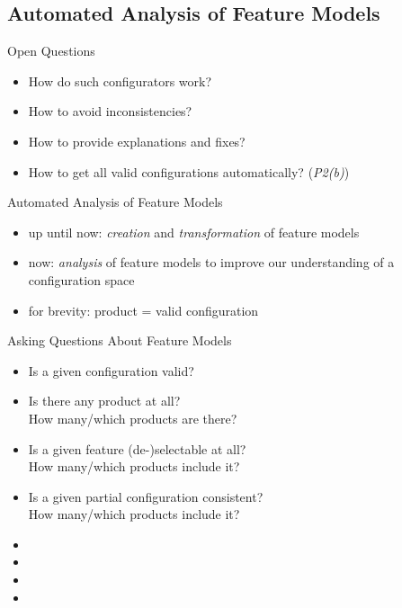 \subsection{Automated Analysis of Feature Models}

\begin{frame}{\myframetitle}
	\begin{mycolumns}
		\begin{note}{Open Questions}
			\begin{itemize}
				\item How do such configurators work?
				\item How to avoid inconsistencies?
				\item How to provide explanations and fixes?
    			\item How to get all valid configurations automatically? (\emph{P2(b)})
			\end{itemize}
		\end{note}
		\begin{definition}{Automated Analysis of Feature Models}
			\begin{itemize}
				\item up until now: \emph{creation} and \emph{transformation} of feature models
				\item now: \emph{analysis} of feature models to improve our understanding of a configuration space
				\item for brevity: product = valid configuration
			\end{itemize}
		\end{definition}
	\mynextcolumn
		\begin{example}{Asking Questions About Feature Models}
			\begin{itemize}
				\item Is a given configuration valid?
				\item Is there any product at all?\\
					How many/which products are there?\\
				\item Is a given feature (de-)selectable at all?\\
					How many/which products include it?\\
				\item Is a given partial configuration consistent?\\
					How many/which products include it?\\
				\item \color{gray}{(Which features always occur together?)}
				\item \color{gray}{(Is a given constraint redundant?)}
				\item \color{gray}{(How do two feature model versions differ?)}
				\item \color{gray}{(Why is \ldots? How to fix \ldots?)}
			\end{itemize}
		\end{example}
	\end{mycolumns}
\end{frame}

